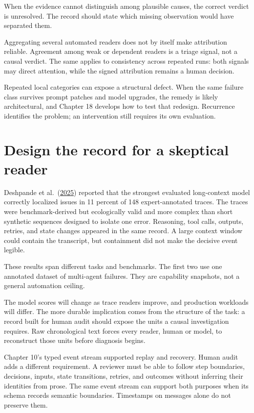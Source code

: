 When the evidence cannot distinguish among plausible causes, the correct verdict is unresolved. The record should state which missing observation would have separated them.

Aggregating several automated readers does not by itself make attribution reliable. Agreement among weak or dependent readers is a triage signal, not a causal verdict. The same applies to consistency across repeated runs: both signals may direct attention, while the signed attribution remains a human decision.

Repeated local categories can expose a structural defect. When the same failure class survives prompt patches and model upgrades, the remedy is likely architectural, and Chapter 18 develops how to test that redesign. Recurrence identifies the problem; an intervention still requires its own evaluation.

\hypertarget{design-the-record-for-a-skeptical-reader}{%
\section{Design the record for a skeptical reader}\label{design-the-record-for-a-skeptical-reader}}

Deshpande et al.~(\href{https://arxiv.org/abs/2505.08638}{2025}) reported that the strongest evaluated long-context model correctly localized issues in 11 percent of 148 expert-annotated traces. The traces were benchmark-derived but ecologically valid and more complex than short synthetic sequences designed to isolate one error. Reasoning, tool calls, outputs, retries, and state changes appeared in the same record. A large context window could contain the transcript, but containment did not make the decisive event legible.

These results span different tasks and benchmarks. The first two use one annotated dataset of multi-agent failures. They are capability snapshots, not a general automation ceiling.

The model scores will change as trace readers improve, and production workloads will differ. The more durable implication comes from the structure of the task: a record built for human audit should expose the units a causal investigation requires. Raw chronological text forces every reader, human or model, to reconstruct those units before diagnosis begins.

Chapter 10's typed event stream supported replay and recovery. Human audit adds a different requirement. A reviewer must be able to follow step boundaries, decisions, inputs, state transitions, retries, and outcomes without inferring their identities from prose. The same event stream can support both purposes when its schema records semantic boundaries. Timestamps on messages alone do not preserve them.

